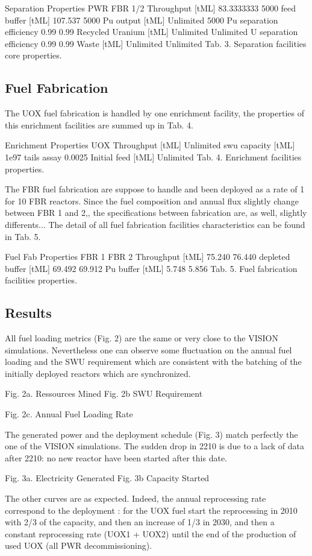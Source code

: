 \documentclass[12pt]{article}
\begin{document}
Separation Properties
PWR 
FBR 1/2
Throughput [tML]
83.3333333
5000
feed buffer [tML]
107.537
5000
Pu output  [tML]
Unlimited
5000
Pu separation efficiency
0.99
0.99
Recycled Uranium [tML]
Unlimited
Unlimited
U separation efficiency
0.99
0.99
Waste [tML]
Unlimited
Unlimited
Tab. 3. Separation facilities core properties.


\subsection{Fuel Fabrication}
The UOX fuel fabrication is handled by one enrichment facility, the properties of this enrichment facilities are summed up in Tab. 4. 

Enrichment Properties
UOX
Throughput [tML]
Unlimited
swu capacity [tML]
1e97
tails assay  
0.0025
Initial feed [tML]
Unlimited
Tab. 4. Enrichment facilities properties.

The FBR fuel fabrication are suppose to handle and been deployed as a rate of 1 for 10 FBR reactors. Since the fuel composition and annual flux slightly change between FBR 1 and 2,, the specifications between fabrication are, as well, slightly differents... The detail of all fuel fabrication facilities characteristics can be found in Tab. 5.


Fuel Fab Properties
FBR 1
FBR 2
Throughput [tML]
75.240
76.440
depleted buffer [tML]
69.492
69.912
Pu buffer  [tML]
5.748
5.856
Tab. 5. Fuel fabrication facilities properties.


\subsection{Results}
All fuel loading metrics (Fig. 2) are the same or very close to the VISION simulations. Nevertheless one can observe some fluctuation on the annual fuel loading and the SWU requirement which are consistent with the batching of the initially deployed reactors which are synchronized.  


Fig. 2a. Ressources Mined				Fig. 2b SWU Requirement		 

Fig. 2c. Annual Fuel Loading Rate


The generated power and the deployment schedule (Fig. 3)  match perfectly the one of the VISION simulations. The sudden drop in 2210 is due to a lack of data after 2210: no new reactor have been started after this date.

Fig. 3a. Electricity Generated				Fig. 3b Capacity Started		

The other curves are as expected. Indeed, the annual reprocessing rate correspond to the deployment :  for the UOX fuel start the reprocessing in 2010 with 2/3 of the capacity, and then an increase of 1/3 in 2030, and then a constant reprocessing rate (UOX1 + UOX2) until the end of the production of used UOX (all PWR decommissioning).
\end{document}
